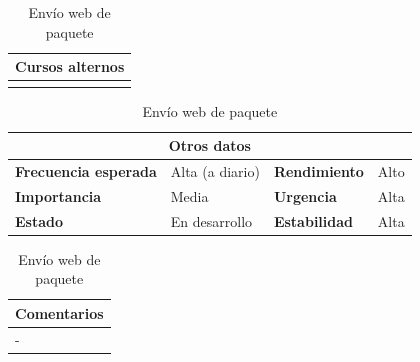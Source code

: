 \documentclass[12pt,spanish]{article}
\begin{document}
\begin{table}[H]
\vspace{1cm}

\begin{tabular}{|m{10pt}|m{7.15cm}|m{10pt}|m{7.15cm}|}
\hline
\multicolumn{4}{|m{16.2cm}|}{\textbf{Cursos alternos}} \\
\hline
\\
\hline
\end{tabular}

\vspace{1cm}

\begin{tabular}{|m{3.72cm}|m{3.72cm}|m{3.72cm}|m{3.72cm}|}
\hline
\multicolumn{4}{|c|}{\textbf{Otros datos}} \\
\hline
\textbf{Frecuencia esperada} & Alta (a diario) & \textbf{Rendimiento} & Alto \\
\hline
\textbf{Importancia} & Media & \textbf{Urgencia} & Alta \\
\hline
\textbf{Estado} & En desarrollo & \textbf{Estabilidad} & Alta \\
\hline
\end{tabular}

\vspace{1cm}

\begin{tabular}{|m{16.2cm}|}
\hline
\textbf{Comentarios} \\
\hline
- \\
\hline
\end{tabular}

\caption{Envío web de paquete}

\end{table}


\end{document}

